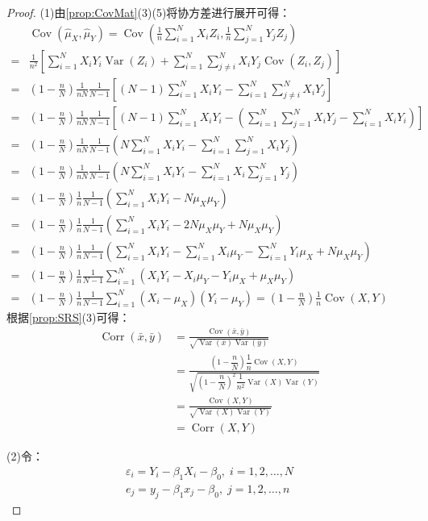 \begin{proof}
	(1)由\cref{prop:CovMat}(3)(5)将协方差进行展开可得：
	\begin{align*}
		&\operatorname{Cov}(\hat{\mu}_X,\hat{\mu}_Y)
		=\operatorname{Cov}\left(\frac{1}{n}\sum_{i=1}^NX_iZ_i,\frac{1}{n}\sum_{j=1}^NY_jZ_j\right) \\
		=&\frac{1}{n^2}\left[\sum_{i=1}^NX_iY_i\operatorname{Var}(Z_i)+\sum_{i=1}^N\sum_{j\ne i}^NX_iY_j\operatorname{Cov}(Z_i,Z_j)\right] \\
		=&\left(1-\frac{n}{N}\right)\frac{1}{nN}\frac{1}{N-1}\left[(N-1)\sum_{i=1}^NX_iY_i-\sum_{i=1}^N\sum_{j\ne i}^NX_iY_j\right] \\
		=&\left(1-\frac{n}{N}\right)\frac{1}{nN}\frac{1}{N-1}\left[(N-1)\sum_{i=1}^NX_iY_i-\left(\sum_{i=1}^N\sum_{j=1}^NX_iY_j-\sum_{i=1}^NX_iY_i\right) \right] \\
		=&\left(1-\frac{n}{N}\right)\frac{1}{nN}\frac{1}{N-1}\left(N\sum_{i=1}^NX_iY_i-\sum_{i=1}^N\sum_{j=1}^NX_iY_j\right) \\
		=&\left(1-\frac{n}{N}\right)\frac{1}{nN}\frac{1}{N-1}\left(N\sum_{i=1}^NX_iY_i-\sum_{i=1}^NX_i\sum_{j=1}^NY_j\right) \\
		=&\left(1-\frac{n}{N}\right)\frac{1}{n}\frac{1}{N-1}\left(\sum_{i=1}^NX_iY_i-N\mu_X\mu_Y\right) \\
		=&\left(1-\frac{n}{N}\right)\frac{1}{n}\frac{1}{N-1}\left(\sum_{i=1}^NX_iY_i-2N\mu_X\mu_Y+N\mu_X\mu_Y\right) \\
		=&\left(1-\frac{n}{N}\right)\frac{1}{n}\frac{1}{N-1}\left(\sum_{i=1}^NX_iY_i-\sum_{i=1}^NX_i\mu_Y-\sum_{i=1}^NY_i\mu_X+N\mu_X\mu_Y\right) \\
		=&\left(1-\frac{n}{N}\right)\frac{1}{n}\frac{1}{N-1}\sum_{i=1}^N(X_iY_i-X_i\mu_Y-Y_i\mu_X+\mu_X\mu_Y) \\
		=&\left(1-\frac{n}{N}\right)\frac{1}{n}\frac{1}{N-1}\sum\limits_{i=1}^N(X_i-\mu_X)(Y_i-\mu_Y) =\left(1-\frac{n}{N}\right)\frac{1}{n}\operatorname{Cov}(X,Y)
	\end{align*}
	根据\cref{prop:SRS}(3)可得：
	\begin{align*}
		\operatorname{Corr}(\bar{x},\bar{y})&=\frac{\operatorname{Cov}(\bar{x},\bar{y})}{\sqrt{\operatorname{Var}(\bar{x})\operatorname{Var}(\bar{y})}} \\
		&=\frac{\left(1-\dfrac{n}{N}\right)\dfrac{1}{n}\operatorname{Cov}(X,Y)}{\sqrt{\left(1-\dfrac{n}{N}\right)^2\dfrac{1}{n^2}\operatorname{Var}(X)\operatorname{Var}(Y)}} \\
		&=\frac{\operatorname{Cov}(X,Y)}{\sqrt{\operatorname{Var}(X)\operatorname{Var}(Y)}} \\
		&=\operatorname{Corr}(X,Y)
	\end{align*}\par
	(2)令：
	\begin{gather*}
		\varepsilon_i=Y_i-\beta_1X_i-\beta_0,\;i=1,2,\dots,N \\ e_j=y_j-\beta_1x_j-\beta_0,\;j=1,2,\dots,n
	\end{gather*}
	
\end{proof}
